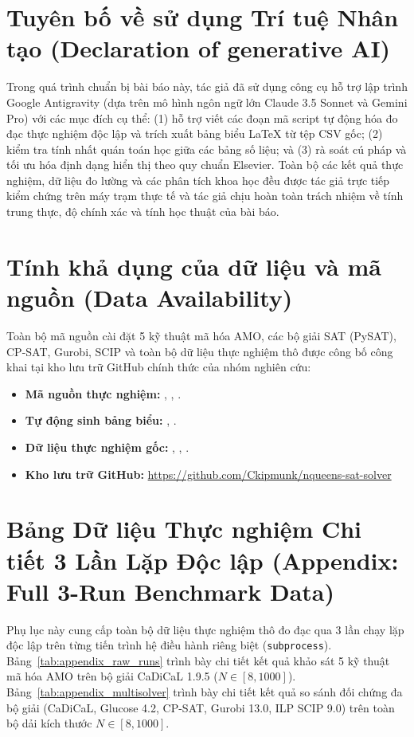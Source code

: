 \documentclass[a4paper,fleqn]{cas-sc}
\begin{document}
\section*{Tuyên bố về sử dụng Trí tuệ Nhân tạo (Declaration of generative AI)}
Trong quá trình chuẩn bị bài báo này, tác giả đã sử dụng công cụ hỗ trợ lập trình Google Antigravity (dựa trên mô hình ngôn ngữ lớn Claude 3.5 Sonnet và Gemini Pro) với các mục đích cụ thể: (1) hỗ trợ viết các đoạn mã script tự động hóa đo đạc thực nghiệm độc lập và trích xuất bảng biểu LaTeX từ tệp CSV gốc; (2) kiểm tra tính nhất quán toán học giữa các bảng số liệu; và (3) rà soát cú pháp và tối ưu hóa định dạng hiển thị theo quy chuẩn Elsevier. Toàn bộ các kết quả thực nghiệm, dữ liệu đo lường và các phân tích khoa học đều được tác giả trực tiếp kiểm chứng trên máy trạm thực tế và tác giả chịu hoàn toàn trách nhiệm về tính trung thực, độ chính xác và tính học thuật của bài báo.

\section*{Tính khả dụng của dữ liệu và mã nguồn (Data Availability)}
Toàn bộ mã nguồn cài đặt 5 kỹ thuật mã hóa AMO, các bộ giải SAT (PySAT), CP-SAT, Gurobi, SCIP và toàn bộ dữ liệu thực nghiệm thô được công bố công khai tại kho lưu trữ GitHub chính thức của nhóm nghiên cứu:
\begin{itemize}
    \item \textbf{Mã nguồn thực nghiệm:} , , .
    \item \textbf{Tự động sinh bảng biểu:} , .
    \item \textbf{Dữ liệu thực nghiệm gốc:} , , .
    \item \textbf{Kho lưu trữ GitHub:} \url{https://github.com/Ckipmunk/nqueens-sat-solver}
\end{itemize}

\appendix
\section{Bảng Dữ liệu Thực nghiệm Chi tiết 3 Lần Lặp Độc lập (Appendix: Full 3-Run Benchmark Data)}
Phụ lục này cung cấp toàn bộ dữ liệu thực nghiệm thô đo đạc qua 3 lần chạy lặp độc lập trên từng tiến trình hệ điều hành riêng biệt (\texttt{subprocess}). Bảng~\ref{tab:appendix_raw_runs} trình bày chi tiết kết quả khảo sát 5 kỹ thuật mã hóa AMO trên bộ giải CaDiCaL 1.9.5 ($N \in [8, 1000]$). Bảng~\ref{tab:appendix_multisolver} trình bày chi tiết kết quả so sánh đối chứng đa bộ giải (CaDiCaL, Glucose 4.2, CP-SAT, Gurobi 13.0, ILP SCIP 9.0) trên toàn bộ dải kích thước $N \in [8, 1000]$.
\end{document}
